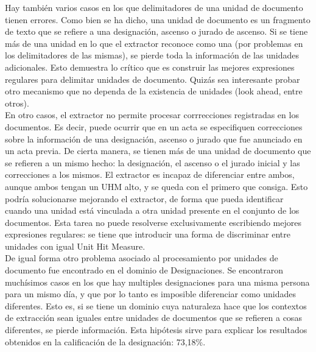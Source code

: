 Hay también varios casos en los que delimitadores de una unidad de documento tienen errores. Como bien se ha dicho, una unidad de documento es un fragmento de texto que se refiere a una designación, ascenso o jurado de ascenso. Si se tiene más de una unidad en lo que el extractor reconoce como una (por problemas en los delimitadores de las mismas), se pierde toda la información de las unidades adicionales. Esto demuestra lo crítico que es construir las mejores expresiones regulares para delimitar unidades de documento. Quizás sea interesante probar otro mecanismo que no dependa de la existencia de unidades (look ahead, entre otros).  \\

En otro casos, el extractor no permite procesar corrrecciones registradas en los documentos. Es decir, puede ocurrir que en un acta se especifiquen correcciones sobre la información de una designación, ascenso o jurado que fue anunciado en un acta previa. De cierta manera, se tienen más de una unidad de documento que se refieren a un mismo hecho: la designación, el ascenso o el jurado inicial y las correcciones a los mismos. El extractor es incapaz de diferenciar entre ambos, aunque ambos tengan un UHM alto, y se queda con el primero que consiga. Esto podría solucionarse mejorando el extractor, de forma que pueda identificar cuando una unidad está vinculada a otra unidad presente en el conjunto de los documentos. Esta tarea no puede resolverse exclusivamente escribiendo mejores expresiones regulares: se tiene que introducir una forma de discriminar entre unidades con igual Unit Hit Measure.\\

De igual forma otro problema asociado al procesamiento por unidades de documento fue encontrado en el dominio de Designaciones. Se encontraron muchísimos casos en los que hay multiples designaciones para una misma persona para un mismo día, y que por lo tanto es imposible diferenciar como unidades diferentes. Esto es, si se tiene un dominio cuya naturaleza hace que los contextos de extracción sean iguales entre unidades de documentos que se refieren a cosas diferentes, se pierde información. Esta hipótesis sirve para explicar los resultados obtenidos en la calificación de la designación: 73,18\%. \\

